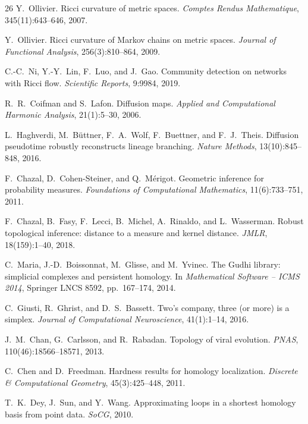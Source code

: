 \documentclass[11pt]{article}
\begin{document}
\begin{thebibliography}{26}
Y.~Ollivier.
Ricci curvature of metric spaces.
\emph{Comptes Rendus Mathematique}, 345(11):643--646, 2007.

Y.~Ollivier.
Ricci curvature of Markov chains on metric spaces.
\emph{Journal of Functional Analysis}, 256(3):810--864, 2009.

C.-C.~Ni, Y.-Y.~Lin, F.~Luo, and J.~Gao.
Community detection on networks with Ricci flow.
\emph{Scientific Reports}, 9:9984, 2019.

R.~R.~Coifman and S.~Lafon.
Diffusion maps.
\emph{Applied and Computational Harmonic Analysis}, 21(1):5--30, 2006.

L.~Haghverdi, M.~B\"uttner, F.~A.~Wolf, F.~Buettner, and F.~J.~Theis.
Diffusion pseudotime robustly reconstructs lineage branching.
\emph{Nature Methods}, 13(10):845--848, 2016.

F.~Chazal, D.~Cohen-Steiner, and Q.~M\'erigot.
Geometric inference for probability measures.
\emph{Foundations of Computational Mathematics}, 11(6):733--751, 2011.

F.~Chazal, B.~Fasy, F.~Lecci, B.~Michel, A.~Rinaldo, and L.~Wasserman.
Robust topological inference: distance to a measure and kernel distance.
\emph{JMLR}, 18(159):1--40, 2018.

C.~Maria, J.-D.~Boissonnat, M.~Glisse, and M.~Yvinec.
The Gudhi library: simplicial complexes and persistent homology.
In \emph{Mathematical Software -- ICMS 2014}, Springer LNCS 8592, pp.~167--174, 2014.

C.~Giusti, R.~Ghrist, and D.~S.~Bassett.
Two's company, three (or more) is a simplex.
\emph{Journal of Computational Neuroscience}, 41(1):1--14, 2016.

J.~M.~Chan, G.~Carlsson, and R.~Rabadan.
Topology of viral evolution.
\emph{PNAS}, 110(46):18566--18571, 2013.

C.~Chen and D.~Freedman.
Hardness results for homology localization.
\emph{Discrete \& Computational Geometry}, 45(3):425--448, 2011.

T.~K.~Dey, J.~Sun, and Y.~Wang.
Approximating loops in a shortest homology basis from point data.
\emph{SoCG}, 2010.

\end{thebibliography}
\end{document}

